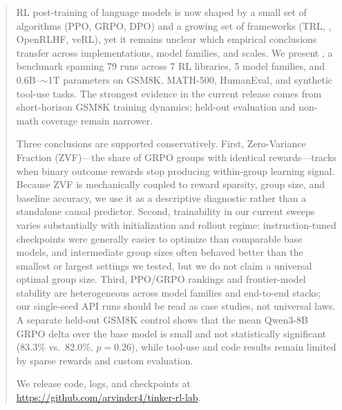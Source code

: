 \begin{abstract}
RL post-training of language models is now shaped by a small set of
algorithms (PPO, GRPO, DPO) and a growing set of frameworks (TRL,
\tinker{}, OpenRLHF, veRL), yet it remains unclear which empirical conclusions
transfer across implementations, model families, and scales. We present
\ours{}, a benchmark spanning 79 runs across 7 RL libraries, 5 model
families, and 0.6B--$\sim$1T parameters on GSM8K, MATH-500, HumanEval, and
synthetic tool-use tasks. The strongest evidence in the current release comes
from short-horizon GSM8K training dynamics; held-out evaluation and non-math
coverage remain narrower.

Three conclusions are supported conservatively. First, Zero-Variance Fraction
(ZVF)---the share of GRPO groups with identical rewards---tracks when binary
outcome rewards stop producing within-group learning signal. Because ZVF is
mechanically coupled to reward sparsity, group size, and baseline accuracy, we
use it as a descriptive diagnostic rather than a standalone causal predictor.
Second, trainability in our current sweeps varies substantially with
initialization and rollout regime: instruction-tuned checkpoints were
generally easier to optimize than comparable base models, and intermediate
group sizes often behaved better than the smallest or largest settings we
tested, but we do not claim a universal optimal group size. Third, PPO/GRPO
rankings and frontier-model stability are heterogeneous across model families
and end-to-end stacks; our single-seed API runs should be read as case studies,
not universal laws. A separate held-out GSM8K control shows that the mean
Qwen3-8B GRPO delta over the base model is small and not statistically
significant (83.3\% vs.\ 82.0\%, $p{=}0.26$), while tool-use and code results
remain limited by sparse rewards and custom evaluation.

We release code, logs, and checkpoints at
\url{https://github.com/arvindcr4/tinker-rl-lab}.
\end{abstract}
